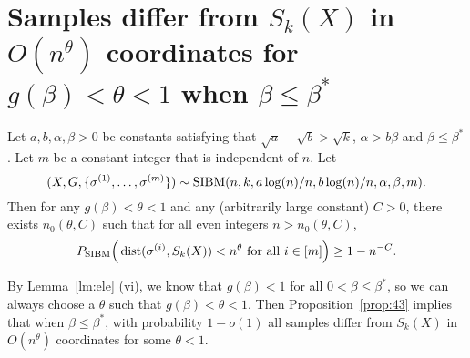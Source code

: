\documentclass{article}
\begin{document}
\section{Samples differ from $S_k(X)$ in $O(n^{\theta})$ coordinates for $g(\beta)<\theta<1$ when $\beta\le\beta^\ast$}
\label{sect:theta}



\begin{proposition} \label{prop:43}
Let $a,b,\alpha,\beta> 0$ be constants satisfying that $\sqrt{a}-\sqrt{b} > \sqrt{k}$, $\alpha>b\beta$ and $\beta\le\beta^\ast$. Let $m$ be a constant integer that is independent of $n$.
Let 
$$
(X,G,\{\sigma^{(1)},\dots,\sigma^{(m)}\})\sim \operatorname{SIBM}(n,k, a\log(n)/n, b\log(n)/n,\alpha,\beta, m) .
$$
Then for any $g(\beta) < \theta < 1$ and any (arbitrarily large constant) $C>0$, there exists $n_0(\theta, C)$ such that for all even integers $n>n_0(\theta, C)$,
$$
P_{\operatorname{SIBM}} \Big(\operatorname{dist}(\sigma^{(i)},S_k(X))<n^{\theta}
\text{~for all~} i\in[m] \Big) \ge 1- n^{-C} .
$$
\end{proposition}

By Lemma~\ref{lm:ele} (vi), we know that $g(\beta)<1$ for all $0<\beta\le\beta^\ast$, so we can always choose a $\theta$ such that $g(\beta)<\theta<1$.
Then Proposition~\ref{prop:43} implies that when $\beta\le\beta^\ast$,
with probability $1-o(1)$ all samples differ from $S_k(X)$ in $O(n^\theta)$ coordinates for some $\theta<1$.
\end{document}
